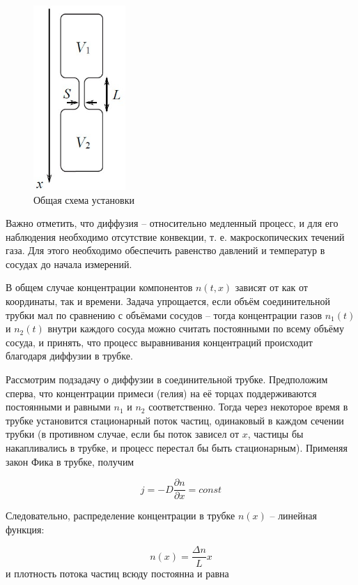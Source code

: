 \documentclass[a4paper, 12pt]{article}
\begin{document}
\begin{figure}
	\includegraphics[width=3.5cm]{ris1.jpg}
	\caption{Общая схема установки}
	\label{ris1}
\end{figure}

Важно отметить, что диффузия -- относительно медленный процесс, и для его наблюдения необходимо отсутствие конвекции, т. е. макроскопических течений газа. Для этого необходимо обеспечить равенство давлений и температур в сосудах до начала измерений.

В общем случае концентрации компонентов $ n(t, x) $ зависят от как от координаты, так и времени. Задача упрощается, если объём соединительной трубки мал по сравнению с объёмами сосудов -- тогда концентрации газов $ n_1(t) $ и $ n_2(t) $ внутри каждого сосуда можно считать постоянными по всему объёму сосуда, и принять, что процесс выравнивания концентраций происходит благодаря диффузии в трубке.

Рассмотрим подзадачу о диффузии в соединительной трубке. Предположим сперва, что концентрации примеси (гелия) на её торцах поддерживаются постоянными и равными $ n_1 $ и $ n_2 $ соответственно. Тогда через некоторое время в трубке установится стационарный поток частиц, одинаковый в каждом сечении трубки (в противном случае, если бы поток зависел от $ x $, частицы бы накапливались в трубке, и процесс перестал бы быть стационарным). Применяя закон Фика в трубке, получим

\[ j=-D\frac{\partial n}{\partial x} = const \]

Следовательно, распределение концентрации в трубке $ n(x) $ -- линейная
функция:

\begin{equation}\label{3}
n(x) = \frac{\Delta n}{L} x
\end{equation}
и плотность потока частиц всюду постоянна и равна
\end{document}
